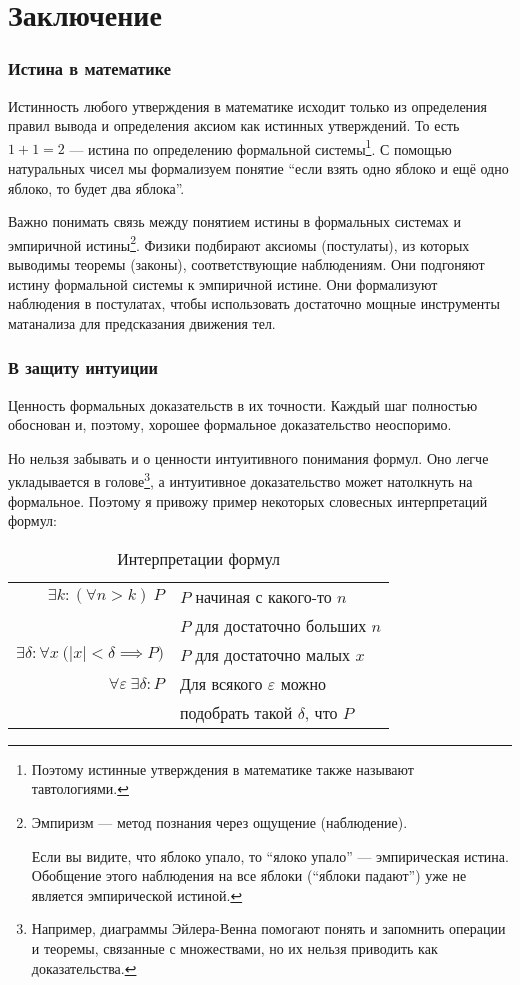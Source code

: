 \part{Заключение}

\section{Истина в математике}

Истинность любого утверждения в математике исходит только из определения правил
вывода и определения аксиом как истинных утверждений.
То есть $1+1=2$ --- истина по определению формальной системы\footnote{
	Поэтому истинные утверждения в математике также называют тавтологиями.}.
С помощью натуральных чисел мы формализуем понятие ``если взять одно яблоко
и ещё одно яблоко, то будет два яблока''.

Важно понимать связь между понятием истины в формальных системах
и эмпиричной истины\footnote{Эмпиризм --- метод познания через ощущение (наблюдение).

	Если вы видите, что яблоко упало, то ``ялоко упало'' --- эмпирическая истина.
	Обобщение этого наблюдения на все яблоки (``яблоки падают'') уже не является
	эмпирической истиной.}.
Физики подбирают аксиомы (постулаты),
из которых выводимы теоремы (законы), соответствующие наблюдениям.
Они подгоняют истину формальной системы к эмпиричной истине.
Они формализуют наблюдения в постулатах, чтобы использовать достаточно мощные
инструменты матанализа для предсказания движения тел.

\section{В защиту интуиции}

Ценность формальных доказательств в их точности. Каждый шаг полностью обоснован и,
поэтому, хорошее формальное доказательство неоспоримо.

Но нельзя забывать и о ценности интуитивного понимания формул.
Оно легче укладывается в голове\footnote{Например, диаграммы
	Эйлера-Венна помогают понять и запомнить операции и теоремы, связанные с
	множествами, но их нельзя приводить как доказательства.},
а интуитивное доказательство может натолкнуть на формальное.
Поэтому я привожу пример некоторых словесных интерпретаций формул:

\begin{table}
	\centering
	\begin{tabular}{r|l}
		$\exists k:(\forall n>k)~P$     & $P$ начиная с какого-то $n$       \\
		                                & $P$ для достаточно больших $n$    \\[1em]
		$\exists \delta:\forall x~
		\big(|x|<\delta\implies P\big)$ & $P$ для достаточно малых $x$      \\[1em]
		$\forall \varepsilon~
		\exists \delta:P$               & Для всякого $\varepsilon$ можно   \\
		                                & подобрать такой $\delta$, что $P$
	\end{tabular}
	\caption{Интерпретации формул}\label{table:formula_interp}
\end{table}

